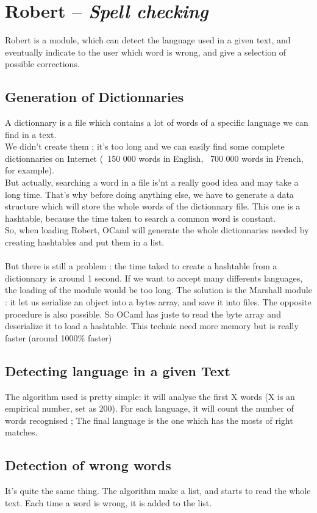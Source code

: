 \chapter{Robert -- \emph{Spell checking}}

Robert is a module, which can detect the language used in a given text, and eventually indicate
to the user which word is wrong, and give a selection of possible corrections.

\section{Generation of Dictionnaries}
A dictionnary is a file which contains a lot of words of a specific language we can find in
a text.\\
We didn't create them ; it's too long and we can easily find some complete dictionnaries on
Internet (~150 000 words in English, ~700 000 words in French, for example).\\
But actually, searching a word in a file is'nt a really good idea and may take a long time.
That's why before doing anything else, we have to generate a data structure which will store
the whole words of the dictionnary file. This one is a hashtable, because the
time taken to search a common word is constant.\\
So, when loading Robert, OCaml will generate the whole dictionnaries needed by creating hashtables
and put them in a list.\\
\\
But there is still a problem : the time taked to create a hashtable from a dictionnary is around 1
second. If we want to accept many differents languages, the loading of the module would be too long.
The solution is the Marshall module : it let us serialize an object into a bytes array, and save it
into files. The opposite procedure is also possible.
So OCaml has juste to read the byte array and deserialize it to load a hashtable. This technic need
more memory but is really faster (around 1000\% faster)
\section{Detecting language in a given Text}
The algorithm used is pretty simple: it will analyse the first X words (X is an empirical number, set
as 200). 
For each language, it will count the number of words recognised ; The final language is the one which has the mosts of right matches.
\section{Detection of wrong words}
It's quite the same thing. The algorithm make a list, and starts to read the whole text. Each time a word is wrong, it is added to the list.
